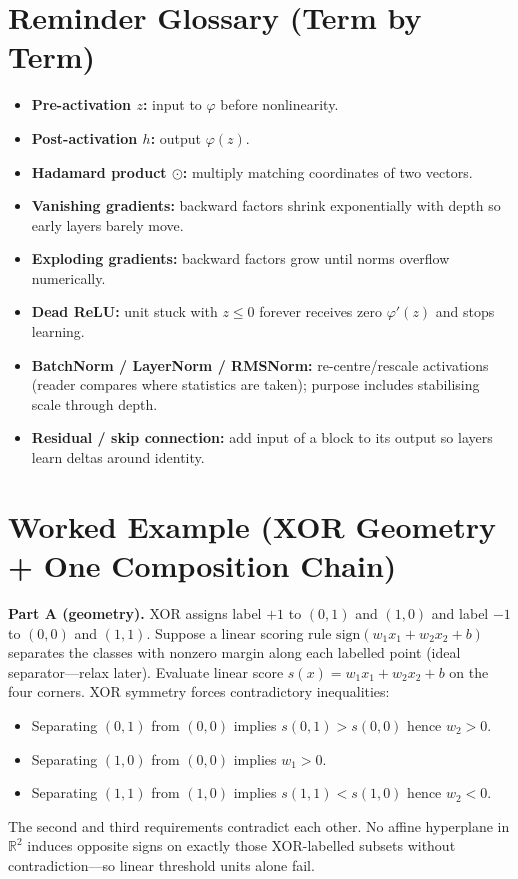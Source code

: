 \section*{Reminder Glossary (Term by Term)}
\begin{itemize}[leftmargin=1.5em]
  \item \textbf{Pre-activation \(z\):} input to \(\varphi\) before nonlinearity.
  \item \textbf{Post-activation \(h\):} output \(\varphi(z)\).
  \item \textbf{Hadamard product \(\odot\):} multiply matching coordinates of two vectors.
  \item \textbf{Vanishing gradients:} backward factors shrink exponentially with depth so early layers barely move.
  \item \textbf{Exploding gradients:} backward factors grow until norms overflow numerically.
  \item \textbf{Dead ReLU:} unit stuck with \(z\le 0\) forever receives zero \(\varphi'(z)\) and stops learning.
  \item \textbf{BatchNorm / LayerNorm / RMSNorm:} re-centre/rescale activations (reader compares where statistics are taken); purpose includes stabilising scale through depth.
  \item \textbf{Residual / skip connection:} add input of a block to its output so layers learn deltas around identity.
\end{itemize}

\section*{Worked Example (XOR Geometry + One Composition Chain)}
\textbf{Part A (geometry).} XOR assigns label $+1$ to $(0,1)$ and $(1,0)$ and label $-1$ to $(0,0)$ and $(1,1)$. Suppose a linear scoring rule $\mathrm{sign}(w_1 x_1 + w_2 x_2 + b)$ separates the classes with nonzero margin along each labelled point (ideal separator---relax later). Evaluate linear score $s(x)=w_1 x_1 + w_2 x_2 + b$ on the four corners. XOR symmetry forces contradictory inequalities:
\begin{itemize}[leftmargin=1.5em]
  \item Separating $(0,1)$ from $(0,0)$ implies $s(0,1)>s(0,0)$ hence $w_2>0$.
  \item Separating $(1,0)$ from $(0,0)$ implies $w_1>0$.
  \item Separating $(1,1)$ from $(1,0)$ implies $s(1,1)<s(1,0)$ hence $w_2<0$.
\end{itemize}
The second and third requirements contradict each other. No affine hyperplane in $\mathbb{R}^2$ induces opposite signs on exactly those XOR-labelled subsets without contradiction---so linear threshold units alone fail.

